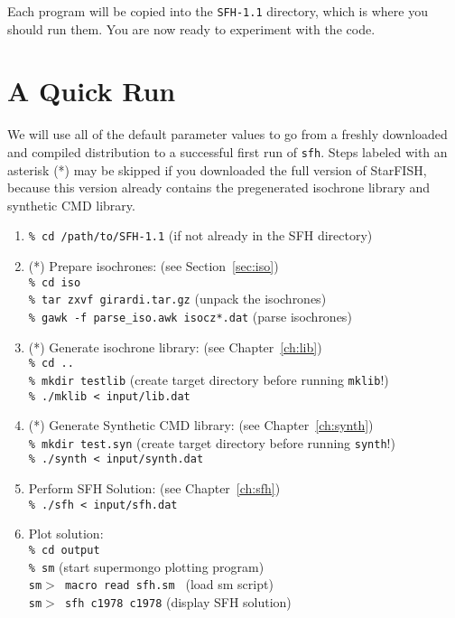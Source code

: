 \documentclass[12pt]{book}
\def\ttg{\tt\color{DarkGreen}}
\begin{document}
\medskip
Each program will be copied into the {\ttg SFH-1.1} directory, which 
is where you should run them.  You are now ready to experiment with 
the code.

\vspace{2em}
\section{A Quick Run}

We will use all of the default parameter values to go from a freshly 
downloaded and compiled distribution to a successful first run of 
{\ttg sfh}.  Steps labeled with an asterisk (*) may be skipped if you 
downloaded the full version of StarFISH, because this version already 
contains the pregenerated isochrone library and synthetic CMD library.

\begin{enumerate}

\item {\ttg \% cd /path/to/SFH-1.1} \hfill (if not already in the SFH directory)

\item (*) Prepare isochrones:  (see Section~\ref{sec:iso})\\
{\ttg \% cd iso} \\
{\ttg \% tar zxvf girardi.tar.gz} \hfill (unpack the isochrones) \\
{\ttg \% gawk -f parse\_iso.awk isocz*.dat} \hfill (parse isochrones) 

\item (*) Generate isochrone library: (see Chapter~\ref{ch:lib})\\
{\ttg \% cd ..} \\
{\ttg \% mkdir testlib} \hfill (create target directory before running {\ttg mklib}!)\\
{\ttg \% ./mklib < input/lib.dat} 

\item (*) Generate Synthetic CMD library: (see Chapter~\ref{ch:synth}) \\
{\ttg \% mkdir test.syn} \hfill (create target directory before running {\ttg synth}!)\\
{\ttg \% ./synth < input/synth.dat} 

\item Perform SFH Solution: (see Chapter~\ref{ch:sfh}) \\
{\ttg \% ./sfh < input/sfh.dat} 

\item Plot solution: \\
{\ttg \% cd output} \\
{\ttg \% sm} \hfill (start supermongo plotting program) \\
{\ttg sm$>$ macro read sfh.sm } \hfill (load sm script) \\
{\ttg sm$>$ sfh c1978 c1978} \hfill (display SFH solution)
\end{enumerate}
\end{document}
